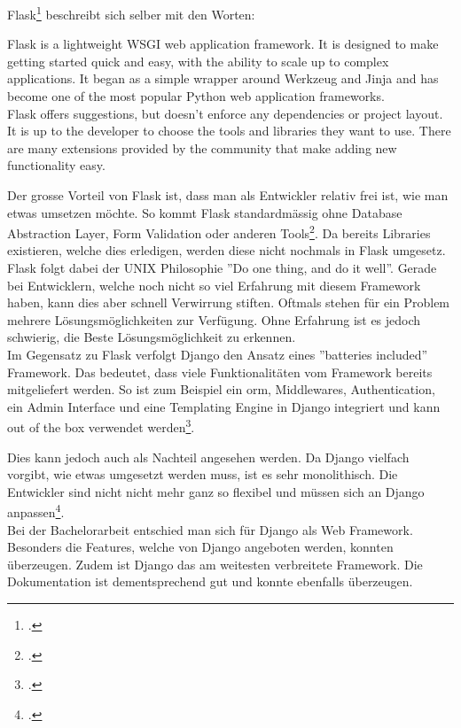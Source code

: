 Flask\footcite{flask:foreword} beschreibt sich selber mit den Worten:

\begin{displayquote}
Flask is a lightweight WSGI web application framework. It is designed to make getting started quick and easy, with the ability to scale up to complex applications. It began as a simple wrapper around Werkzeug and Jinja and has become one of the most popular Python web application frameworks. \\
Flask offers suggestions, but doesn't enforce any dependencies or project layout. It is up to the developer to choose the tools and libraries they want to use. There are many extensions provided by the community that make adding new functionality easy.
\end{displayquote}

Der grosse Vorteil von Flask ist, dass man als Entwickler relativ frei ist, wie man etwas umsetzen möchte. So kommt Flask standardmässig ohne Database Abstraction Layer, Form Validation oder anderen Tools\footcite{flask:design}. Da bereits Libraries existieren, welche dies erledigen, werden diese nicht nochmals in Flask umgesetz. Flask folgt dabei der UNIX Philosophie ''Do one thing, and do it well''. Gerade bei Entwicklern, welche noch nicht so viel Erfahrung mit diesem Framework haben, kann dies aber schnell Verwirrung stiften. Oftmals stehen für ein Problem mehrere Lösungsmöglichkeiten zur Verfügung. Ohne Erfahrung ist es jedoch schwierig, die Beste Lösungsmöglichkeit zu erkennen.\\

Im Gegensatz zu Flask verfolgt Django den Ansatz eines ''batteries included'' Framework. Das bedeutet, dass viele Funktionalitäten vom Framework bereits mitgeliefert werden. So ist zum Beispiel ein \gls{orm}, Middlewares, Authentication, ein Admin Interface und eine Templating Engine in Django integriert und kann out of the box verwendet werden\footcite{django:overview}.

Dies kann jedoch auch als Nachteil angesehen werden. Da Django vielfach vorgibt, wie etwas umgesetzt werden muss, ist es sehr monolithisch. Die Entwickler sind nicht nicht mehr ganz so flexibel und müssen sich an Django anpassen\footcite{django:advantages_disadvantages}. \\

Bei der Bachelorarbeit entschied man sich für Django als Web Framework. Besonders die Features, welche von Django angeboten werden, konnten überzeugen. Zudem ist Django das am weitesten verbreitete Framework. Die Dokumentation ist dementsprechend gut und konnte ebenfalls überzeugen.


